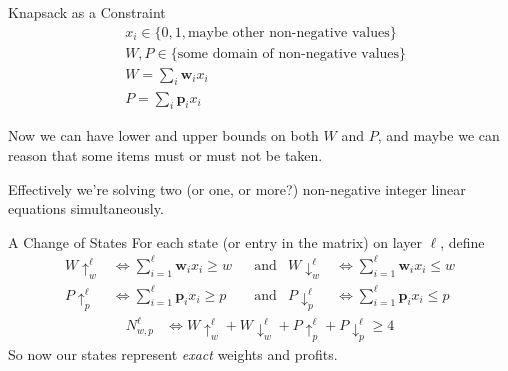 \documentclass[aspectratio=169,compress,10pt]{beamer}
\begin{document}
\begin{frame}{Knapsack as a Constraint}
    \begin{align*}
        &x_i \in \{0, 1, \text{maybe other non-negative values}\}\\
        &W, P \in \{\text{some domain of non-negative values}\}\\
        &W = \sum_i \boldsymbol{w}_i x_i\\
        &P = \sum_i \boldsymbol{p}_i x_i
    \end{align*}

    Now we can have lower and upper bounds on both $W$ and $P$, and maybe we can reason that some
    items must or must not be taken.

    \medskip

    Effectively we're solving two (or one, or more?) non-negative integer linear equations simultaneously.
\end{frame}

\begin{frame}{A Change of States}
    For each state (or entry in the matrix) on layer $\ell$, define
    \begin{align*}
        W{\uparrow}^{\ell}_{w} &\Leftrightarrow \sum_{i=1}^{\ell} \boldsymbol{w}_i x_i \ge w
        &&\text{and}&
        W{\downarrow}^{\ell}_{w} &\Leftrightarrow \sum_{i=1}^{\ell} \boldsymbol{w}_i x_i \le w \\
        P{\uparrow}^{\ell}_{p} &\Leftrightarrow \sum_{i=1}^{\ell} \boldsymbol{p}_i x_i \ge p
        &&\text{and}&
        P{\downarrow}^{\ell}_{p} &\Leftrightarrow \sum_{i=1}^{\ell} \boldsymbol{p}_i x_i \le p
    \end{align*}\begin{align*}
        N^{\ell}_{w,p} & \Leftrightarrow W{\uparrow}^{\ell}_{w} + W{\downarrow}^{\ell}_{w} + P{\uparrow}^{\ell}_{p} + P{\downarrow}^{\ell}_{p} \ge 4
    \end{align*}
    So now our states represent \emph{exact} weights and profits.
\end{frame}
\end{document}
